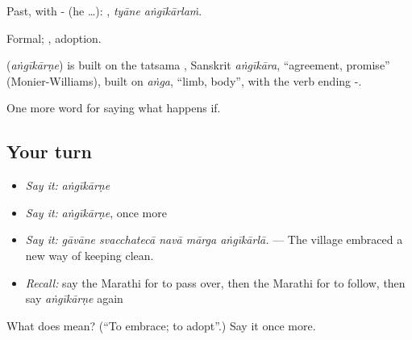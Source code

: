 Past, with - (he …):  , \emph{tyāne aṅgīkārlaṁ}.

Formal; , adoption.

\begin{cousinweb}
\textbf{} (\emph{aṅgīkārṇe}) is built on the tatsama , Sanskrit \emph{aṅgīkāra}, \textquotedblleft{}agreement, promise\textquotedblright{} (Monier-Williams), built on \emph{aṅga}, \textquotedblleft{}limb, body\textquotedblright{}, with the verb ending -.
\end{cousinweb}

\begin{grammarlens}[title={What you've built}]
One more word for saying what happens if.
\end{grammarlens}

\subsection*{Your turn}
\begin{itemize}
\raggedright
  \item \emph{Say it:} \emph{aṅgīkārṇe}
  \item \emph{Say it:} \emph{aṅgīkārṇe}, once more
  \item \emph{Say it:} \emph{gāvāne svacchatecā navā mārga aṅgīkārlā.} — The village embraced a new way of keeping clean.
  \item \emph{Recall:} say the Marathi for to pass over, then the Marathi for to follow, then say \emph{aṅgīkārṇe} again
\end{itemize}

\begin{tcolorbox}[breakable,colback=teal!4,colframe=teal!35!black,title={Before you move on}]
What does  mean? (\textquotedblleft{}To embrace; to adopt\textquotedblright{}.) Say it once more.
\end{tcolorbox}
